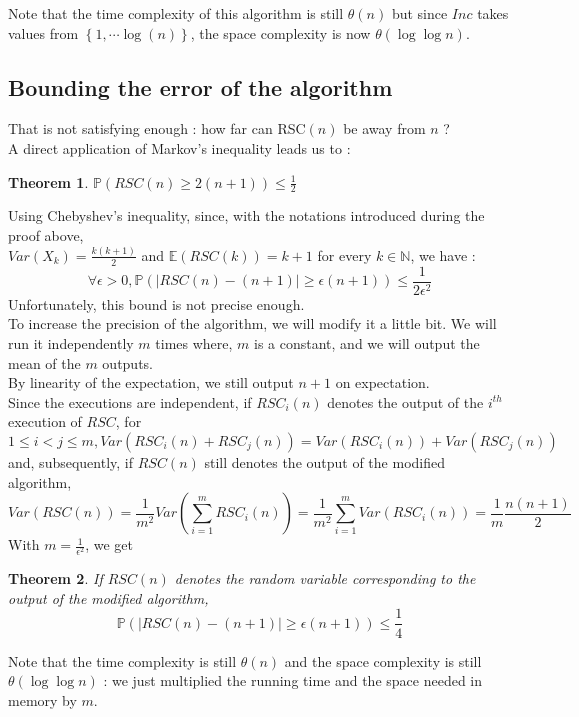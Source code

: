 \documentclass{article}
\theoremstyle{plain}
\theoremstyle{plain}
\newtheorem{thm}{Theorem}
\theoremstyle{plain}
\theoremstyle{plain}
\begin{document}
Note that the time complexity of this algorithm is still $\theta\left(n\right)$ but since $Inc$ takes values from $\left\{1,\cdots \log(n)\right\}$, the space complexity is now $\theta{\left(\log \log n\right)}$.


\subsection{Bounding the error of the algorithm}
That is not satisfying enough : how far can RSC$(n)$ be away from $n$ ?\\A direct application of Markov's inequality leads us to : 

\begin{thm}
$\mathbb{P}\left(RSC(n) \geq 2(n+1)\right) \leq \frac{1}{2}$
\end{thm}

Using Chebyshev's inequality, since, with the notations introduced during the proof above, \\$Var\left(X_k\right) = \frac{k(k+1)}{2}$ and $\mathbb{E}\left(RSC(k)\right) = k + 1$ for every $k \in \mathbb{N}$, we have : \[\forall \epsilon > 0, \mathbb{P}\left(\left|RSC(n) - (n+1)\right|\geq \epsilon\left(n + 1\right)\right) \leq \frac{1}{2\epsilon^2}\]Unfortunately, this bound is not precise enough.\\To increase the precision of the algorithm, we will modify it a little bit. We will run it independently $m$ times where, $m$ is a constant, and we will output the mean of the $m$ outputs.\\ By linearity of the expectation, we still output $n + 1$ on expectation.\\Since the executions are independent, if $RSC_i(n)$ denotes the output of the $i^{th}$ execution of $RSC$, for $1\leq i < j\leq m, Var(RSC_i(n) + RSC_j(n)) = Var(RSC_i(n)) + Var(RSC_j(n))$ and, subsequently, if $RSC(n)$ still denotes the output of the modified algorithm, \[Var(RSC(n)) = \frac{1}{m^2} Var\left(\sum_{i=1}^{m}RSC_i(n)\right) = \frac{1}{m^2}\sum_{i=1}^{m}{Var\left(RSC_i(n)\right)} = \frac{1}{m} \frac{n\left(n+1\right)}{2}\]
With $m = \frac{1}{\epsilon^2}$, we get 
\begin{thm}
If $RSC(n)$ denotes the random variable corresponding to the output of the modified algorithm,
\[\mathbb{P}\left(\left|RSC(n)-(n + 1)\right|\geq \epsilon (n + 1)\right) \leq \frac{1}{4}\]
\end{thm}
Note that the time complexity is still $\theta\left(n\right)$ and the space complexity is still $\theta\left(\log \log n\right)$ : we just multiplied the running time and the space needed in memory by $m$.
\end{document}
